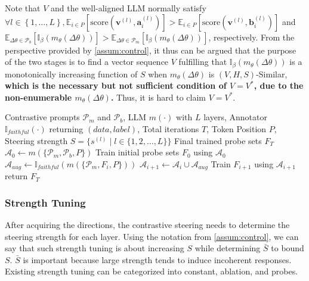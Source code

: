 \documentclass{article}
\theoremstyle{plain}
\theoremstyle{definition}
\theoremstyle{remark}
\begin{document}
Note that $V$ and the well-aligned LLM normally satisfy $\forall l \in \left\{1,\dots,L\right\}, \mathbb{E}_{i \in P}[\text{score}(\mathbf{v}^{(l)}, \mathbf{a}_{i}^{(l)})] > \mathbb{E}_{i \in P}[\text{score}(\mathbf{v}^{(l)}, \mathbf{b}_{i}^{(l)})]$ and $\mathbb{E}_{\Delta\theta \in \mathcal{P}_{b}}[\mathbb{I}_{\beta}(m_{\theta}(\Delta\theta))] > \mathbb{E}_{\Delta\theta \in \mathcal{P}_{m}}[\mathbb{I}_{\beta}(m_{\theta}(\Delta\theta))]$, respectively. From the perspective provided by \cref{assum:control}, it thus can be argued that the purpose of the two stages is to find a vector sequence $V$ fulfilling that $\mathbb{I}_{\beta}(m_{\theta}(\Delta\theta))$ is a monotonically increasing function of $S$ when $m_{\theta}(\Delta\theta)$ is $(V, H, S)$-Similar, \textbf{which is the necessary but not sufficient condition of $V = V^*$, due to the non-enumerable $m_{\theta}(\Delta\theta)$.} Thus, it is hard to claim $V = V^*$.

\begin{algorithm}[!t]
	\caption{Iterative Training Set Augmentation with Contrastive Activations}\label{algor:all}
	\begin{algorithmic}[1]
		\REQUIRE Contrastive prompts $\mathcal{P}_m$ and $\mathcal{P}_b$, LLM $m(\cdot)$ with $L$ layers, Annotator $\mathbb{I}_{faithful}(\cdot)$ returning $(data, label)$, Total iterations $T$, Token Position $P$, Steering strength $S = \{s^{(l)} \mid l \in \{1,2,\dots,L\}\}$
		\ENSURE Final trained probe sets $F_T$
		\STATE $\mathcal{A}_{0} \leftarrow m(\{\mathcal{P}_m, \mathcal{P}_b, P\})$
		\STATE Train initial probe sets $F_0$ using $\mathcal{A}_0$
		\STATE $\mathcal{A}_{aug} \leftarrow \mathbb{I}_{faithful}(m(\{\mathcal{P}_m, F_{i}, P\}))$
		\STATE $\mathcal{A}_{i+1} \leftarrow \mathcal{A}_{i} \cup \mathcal{A}_{aug}$
		\STATE Train $F_{i+1}$ using $\mathcal{A}_{i+1}$
		\ENDFOR
		\STATE return $F_T$
	\end{algorithmic}
\end{algorithm}


\subsubsection{Strength Tuning}\label{sec:introStrength}

After acquiring the directions, the contrastive steering needs to determine the steering strength for each layer. Using the notation from \cref{assum:control}, we can say that such strength tuning is about increasing $S$ while determining $\bar{S}$ to bound $S$. $\bar{S}$ is important because large strength tends to induce incoherent responses. Existing strength tuning can be categorized into constant, ablation, and probes.
\end{document}
